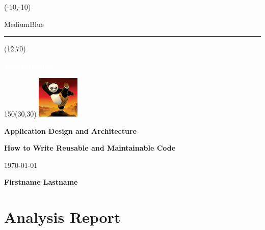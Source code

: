 \documentclass{report}
\begin{document}
    \setlength{\TPHorizModule}{1mm}
    \setlength{\TPVertModule}{1mm}

    \begin{titlepage}
        \begin{textblock}{50}(-10,-10)
            \begin{color}{MediumBlue}
                \rule{3cm}{30cm} %
            \end{color}
        \end{textblock}

        \begin{textblock}{20}(12,70) %
            \begin{rotate}{90}
            {\huge\bfseries \textcolor{white}{Programming}}
            \end{rotate}
        \end{textblock}

        \begin{textblock}{150}(30,30) %
            \includegraphics[height=20mm]{images/panda}\medskip

            {\huge\bfseries Application Design and Architecture }\medskip

            {\Large\bfseries How to Write Reusable and Maintainable Code }\medskip

            {\large\today}\vspace{10mm}

            {\large\bfseries Firstname Lastname}
        \end{textblock}

        \setlength{\cftbeforetoctitleskip}{300pt} %
        \setlength{\cftaftertoctitleskip}{20pt}
        \tableofcontents

        \thispagestyle{empty} %
	\end{titlepage}


    \chapter{Analysis Report}
    \thispagestyle{fancy} %
\end{document}
